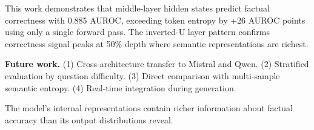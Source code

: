 
This work demonstrates that middle-layer hidden states predict factual correctness with 0.885 AUROC, exceeding token entropy by +26 AUROC points using only a single forward pass. The inverted-U layer pattern confirms correctness signal peaks at 50\% depth where semantic representations are richest.

\textbf{Future work.} (1) Cross-architecture transfer to Mistral and Qwen. (2) Stratified evaluation by question difficulty. (3) Direct comparison with multi-sample semantic entropy. (4) Real-time integration during generation.

The model's internal representations contain richer information about factual accuracy than its output distributions reveal.

